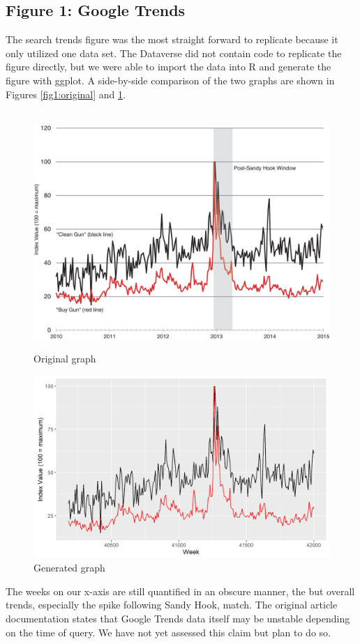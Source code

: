 \documentclass[12pt]{article}%
\begin{document}
\subsection*{Figure 1: Google Trends}
The search trends figure was the most straight forward to replicate because it only utilized one data set. The Dataverse did not contain code to replicate the figure directly, but we were able to import the data into R and generate the figure with ggplot. A side-by-side comparison of the two graphs are shown in Figures \ref{fig1:original} and \ref{fig:fig1_generated}. \\ \\
\begin{figure}[htbb]
	\begin{minipage}[b]{0.5\linewidth}
		\centering
		\includegraphics[width=\linewidth]{figures/fig1_original.jpg}
		\caption{Original graph}
		\label{fig:fig1_original}
	\end{minipage}
	\hspace{0.5cm}
	\begin{minipage}[b]{0.5\linewidth}
		\centering
		\includegraphics[width=\linewidth]{figures/fig1_generated.png}
		\caption{Generated graph}
		\label{fig:fig1_generated}
	\end{minipage}
\end{figure}
The weeks on our x-axis are still quantified in an obscure manner, the but overall trends, especially the spike following Sandy Hook, match. The original article documentation states that Google Trends data itself may be unstable depending on the time of query. We have not yet assessed this claim but plan to do so. 
\end{document}
